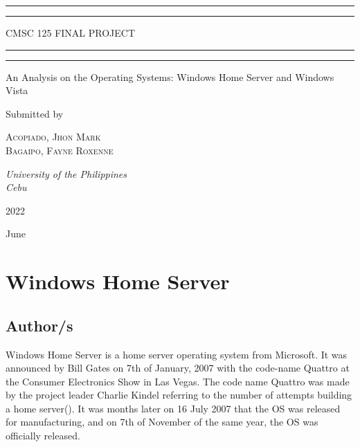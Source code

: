 \documentclass[a4paper, 12pt]{article}
\begin{document}
 
\begin{titlepage}
	\centering
	\scshape

	\rule{\textwidth}{1.6pt}\vspace*{-\baselineskip}\vspace*{2pt}
	\rule{\textwidth}{0.4pt}
	
	\vspace{0.75\baselineskip} 
	
	{\LARGE CMSC 125 FINAL PROJECT\\}
	
	\vspace{0.75\baselineskip}
	
	\rule{\textwidth}{0.4pt}\vspace*{-\baselineskip}\vspace{3.2pt}
	\rule{\textwidth}{1.6pt}
	
	
	An Analysis on the Operating Systems: Windows Home Server and Windows Vista
	\vspace*{3\baselineskip}
	
	
	Submitted by
	
	\vspace{0.5\baselineskip}
	{\scshape\Large Acopiado, Jhon Mark \\ Bagaipo, Fayne Roxenne \\}
	\vspace{0.5\baselineskip}
	
	\textit{University of the Philippines \\ Cebu}
	\vfill
	
	\vspace{0.3\baselineskip}
	
	2022
	
	{\large June}
\end{titlepage}

\tableofcontents



\newpage
\section{Windows Home Server}

\subsection{Author/s}
Windows Home Server is a home server operating system from Microsoft. It was announced by Bill Gates on 7th of January, 2007 with the code-name Quattro at the Consumer Electronics Show in Las Vegas. The code name Quattro was made by the project leader Charlie Kindel referring to the number of attempts building a home server(\cite{Edney2007guide}). It was months later on 16 July 2007 that the OS was released for manufacturing, and on 7th of November of the same year, the OS was officially released. 
\end{document}
